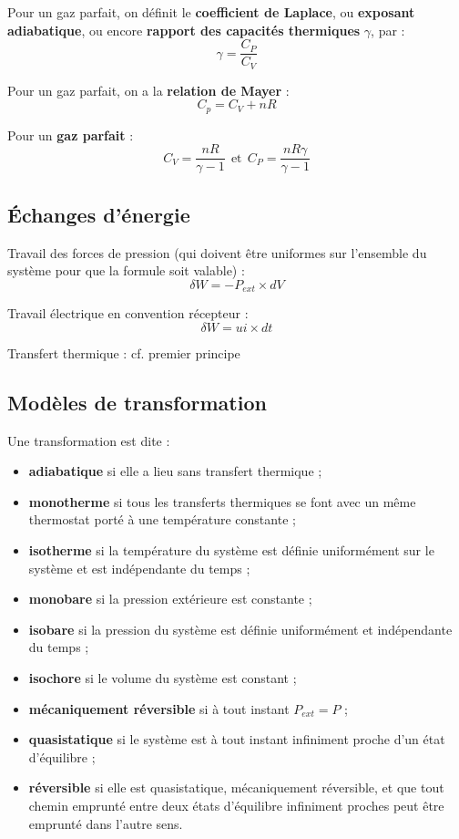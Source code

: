 \documentclass[french]{book}
\theoremstyle{plain}
\theoremstyle{definition}
\theoremstyle{remark}
\begin{document}
Pour un gaz parfait, on définit le \textbf{coefficient de Laplace}, ou \textbf{exposant adiabatique}, ou encore \textbf{rapport des capacités thermiques} $\gamma$, par : $$\gamma=\frac{C_P}{C_V}$$ \par 
Pour un gaz parfait, on a la \textbf{relation de Mayer} : $$C_p=C_V+nR$$ \par 
Pour un \textbf{gaz parfait} : $$C_V=\frac{nR}{\gamma-1} \ \ \text{et} \ \ C_P=\frac{nR\gamma}{\gamma-1}$$
\subsection{Échanges d'énergie}
Travail des forces de pression (qui doivent être uniformes sur l'ensemble du système pour que la formule soit valable) : $$\delta W=-P_{ext}\times dV$$ \par Travail électrique en convention récepteur : $$\delta W=ui\times dt$$ \par Transfert thermique : cf. premier principe
\subsection{Modèles de transformation}
Une transformation est dite :
\begin{itemize}
	\item \textbf{adiabatique} si elle a lieu sans transfert thermique ; 
	\item \textbf{monotherme} si tous les transferts thermiques se font avec un même thermostat porté à une température constante ;
	\item \textbf{isotherme} si la température du système est définie uniformément sur le système et est indépendante du temps ;
	\item \textbf{monobare} si la pression extérieure est constante ;
	\item \textbf{isobare} si la pression du système est définie uniformément et indépendante du temps ;
	\item \textbf{isochore} si le volume du système est constant ;
	\item \textbf{mécaniquement réversible} si à tout instant $P_{ext}=P$ ;
	\item \textbf{quasistatique} si le système est à tout instant infiniment proche d'un état d'équilibre ;
	\item \textbf{réversible} si elle est quasistatique, mécaniquement réversible, et que tout chemin emprunté entre deux états d'équilibre infiniment proches peut être emprunté dans l'autre sens.
\end{itemize}
\end{document}
